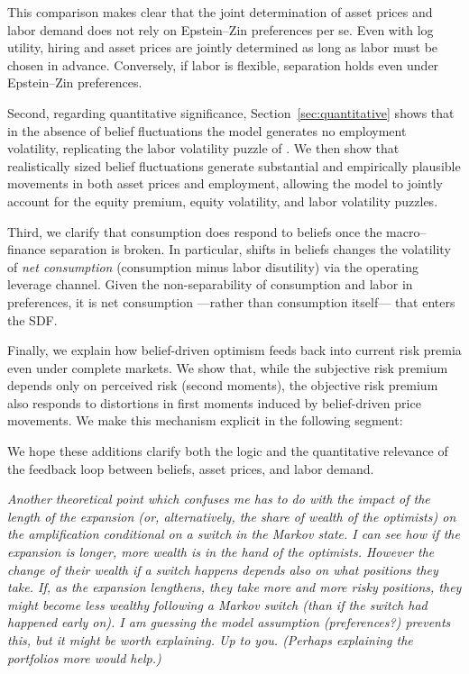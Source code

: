 \documentclass[12pt,a4paper]{article}
\newcommand{\commentbox}[1]{
\begin{mdframed}[style=commentbox] 
		\textit{#1}
\end{mdframed}}
\newcommand{\changesbox}[1]{
	\noindent\vspace{-8pt}
\begin{mdframed}[style=manuscript] 
	#1
\end{mdframed}}
\begin{document}
\changesbox{
}

This comparison makes clear that the joint determination of asset prices and labor demand
does not rely on Epstein--Zin preferences per se. Even with log utility, hiring and asset
prices are jointly determined as long as labor must be chosen in advance. Conversely, if
labor is flexible, separation holds even under Epstein--Zin preferences.

Second, regarding quantitative significance, Section~\ref{sec:quantitative} shows that
in the absence of belief fluctuations the model generates no employment volatility,
replicating the labor volatility puzzle of \citet{shimer2010labor}. We then show that
realistically sized belief fluctuations generate substantial and empirically plausible
movements in both asset prices and employment, allowing the model to jointly account for
the equity premium, equity volatility, and labor volatility puzzles.

Third, we clarify that consumption does respond to beliefs once the macro--finance
separation is broken. In particular, shifts in beliefs changes the volatility of \emph{net consumption}
(consumption minus labor disutility) via the operating leverage channel. Given the
non-separability of consumption and labor in preferences, it is net consumption ---rather
than consumption itself--- that enters the SDF.

Finally, we explain how belief-driven optimism feeds back into current risk premia even
under complete markets. We show that, while the subjective risk premium depends only on
perceived risk (second moments), the objective risk premium also responds to distortions
in first moments induced by belief-driven price movements. We make this mechanism
explicit in the following segment:

\changesbox{
}

We hope these additions clarify both the logic and the quantitative relevance of the
feedback loop between beliefs, asset prices, and labor demand.

\commentbox{
	Another theoretical point which confuses me has to do with the impact of the length of the expansion (or, alternatively, the share of wealth of the optimists) on the amplification conditional on a switch in the Markov state. I can see how if the expansion is longer, more wealth is in the hand of the optimists. However the change of their wealth if a switch happens depends also on what positions they take. If, as the expansion lengthens, they take more and more risky positions, they might become less wealthy following a Markov switch (than if the switch had happened early on). I am guessing the model assumption (preferences?) prevents this, but it might be worth explaining. Up to you. (Perhaps explaining the portfolios more would help.)
}
\end{document}
